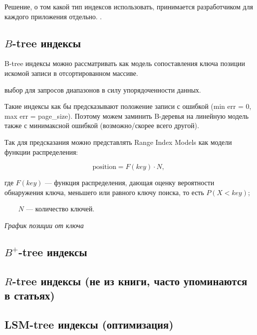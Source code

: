 Решение, о том какой тип индексов использовать, принимается разработчиком для
каждого приложения отдельно. .

\subsection{$B$-tree индексы}

B-tree индексы можно рассматривать как модель сопоставления ключа позиции
искомой записи в отсортированном массиве.

 выбор для запросов диапазонов в силу упорядоченности данных.

Такие индексы как бы предсказывают положение записи с  ошибкой (min err = 0, max err = page\_size). Поэтому можем заминить
B-деревья на линейную модель также с минимаксной ошибкой (возможно/скорее всего
другой).

Так для предсказания можно представлять Range Index Models как модели функции
распределения:

\begin{equation}
    \text{position} = F(key) \cdot N,
\end{equation}


где $F(key)$ --- функция распределения, дающая оценку вероятности обнаружения
ключа, меньшего или равного ключу поиска, то есть $P(X < key)$;

~~~~$N$ --- количество ключей.

\textit{График позиции от ключа}

\subsection{$B^+$-tree индексы}

\subsection{$R$-tree индексы (не из книги, часто упоминаются в статьях)}

\subsection{LSM-tree индексы (оптимизация)}

